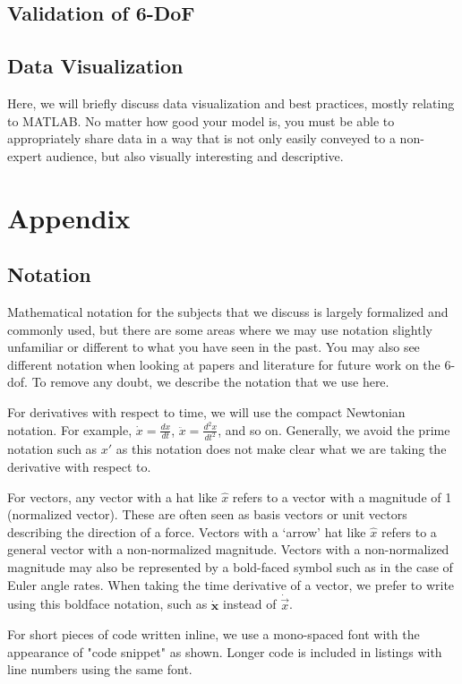 \documentclass[12pt]{report}
\begin{document}
\section{Validation of 6-DoF}

\section{Data Visualization}
Here, we will briefly discuss data visualization and best practices, mostly relating to MATLAB. No matter how good your model is, you must be able to appropriately share data in a way that is not only easily conveyed to a non-expert audience, but also visually interesting and descriptive.


\chapter{Appendix}
\section{Notation}
Mathematical notation for the subjects that we discuss is largely formalized and commonly used, but there are some areas where we may use notation slightly unfamiliar or different to what you have seen in the past. You may also see different notation when looking at papers and literature for future work on the 6-\gls{dof}. To remove any doubt, we describe the notation that we use here.

For derivatives with respect to time, we will use the compact Newtonian notation. For example, $\dot{x}=\frac{dx}{dt}$, $\ddot{x}=\frac{d^2x}{dt^2}$, and so on. Generally, we avoid the prime notation such as $x'$ as this notation does not make clear what we are taking the derivative with respect to.

For vectors, any vector with a hat like $\hat{x}$ refers to a vector with a magnitude of 1 (normalized vector). These are often seen as basis vectors or unit vectors describing the direction of a force. Vectors with a ‘arrow’ hat like $\hat{x}$ refers to a general vector with a non-normalized magnitude. Vectors with a non-normalized magnitude may also be represented by a bold-faced symbol such as in the case of Euler angle rates. When taking the time derivative of a vector, we prefer to write using this boldface notation, such as $\dot{\textbf{x}}$ instead of $\dot{\vec{x}}$.

For short pieces of code written inline, we use a mono-spaced font with the appearance of "code snippet" as shown. Longer code is included in listings with line numbers using the same font.
\end{document}
